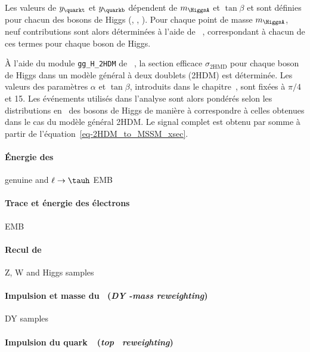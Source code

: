 Les valeurs de $y_{\quarkt}$ et $y_{\quarkb}$ dépendent de $m_{\HiggsA}$ et $\tan\beta$ et sont définies pour chacun des bosons de Higgs (\higgs, \Higgs, \HiggsA).
Pour chaque point de masse $m_{\HiggsA}$, neuf contributions sont alors déterminées à l'aide de \POWHEG~\cite{Alioli:2010xd},
correspondant à chacun de ces termes pour chaque boson de Higgs.
\par
À l'aide du module \texttt{gg\_H\_2HDM} de \POWHEG~\cite{Alioli:2010xd}, la section efficace $\sigma_\text{2HMD}$ pour chaque boson de Higgs dans un modèle général à deux doublets (2HDM) est déterminée.
Les valeurs des paramètres $\alpha$ et $\tan\beta$, introduits dans le chapitre~, sont fixées à $\pi/4$ et 15.
Les événements utilisés dans l'analyse sont alors pondérés selon les distributions en \pT\ des bosons de Higgs de manière à correspondre à celles obtenues dans le cas du modèle général 2HDM.
Le signal complet est obtenu par somme à partir de l'équation~\eqref{eq-2HDM_to_MSSM_xsec}.



\paragraph{Énergie des \tauh} genuine and $\ell\to\tauh$ EMB

\paragraph{Trace et énergie des électrons} EMB

\paragraph{Recul de \MET} Z, W and Higgs samples

\paragraph{Impulsion et masse du \Zboson\ (\emph{DY \pT-mass reweighting})} DY samples

\paragraph{Impulsion du quark~\quarkt\ (\emph{top \pT\ reweighting})} \ttbar

%
%
%
%
%
%
%
%
%
%

